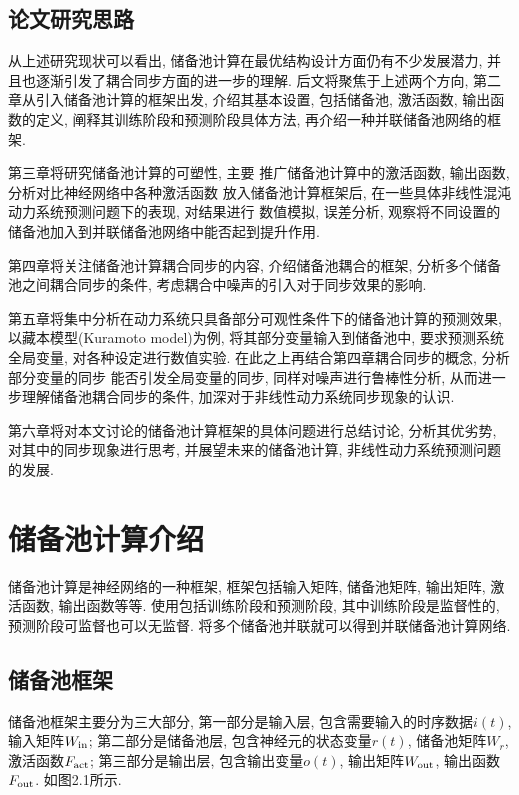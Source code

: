 \documentclass[notitlepage,cs4size,punct,oneside]{ctexrep}
\numberwithin{equation}{chapter}
\theoremstyle{mystyle}
\begin{document}
\section{论文研究思路}

从上述研究现状可以看出, 储备池计算在最优结构设计方面仍有不少发展潜力, 
并且也逐渐引发了耦合同步方面的进一步的理解. 
后文将聚焦于上述两个方向, 第二章从引入储备池计算的框架出发, 
介绍其基本设置, 包括储备池, 激活函数, 输出函数的定义, 
阐释其训练阶段和预测阶段具体方法, 再介绍一种并联储备池网络的框架. 

第三章将研究储备池计算的可塑性, 主要
推广储备池计算中的激活函数, 输出函数, 分析对比神经网络中各种激活函数
放入储备池计算框架后, 在一些具体非线性混沌动力系统预测问题下的表现, 对结果进行
数值模拟, 误差分析, 观察将不同设置的储备池加入到并联储备池网络中能否起到提升作用. 

第四章将关注储备池计算耦合同步的内容, 介绍储备池耦合的框架, 
分析多个储备池之间耦合同步的条件, 考虑耦合中噪声的引入对于同步效果的影响. 

第五章将集中分析在动力系统只具备部分可观性条件下的储备池计算的预测效果, 
以藏本模型(Kuramoto model)为例, 将其部分变量输入到储备池中, 要求预测系统全局变量, 
对各种设定进行数值实验. 在此之上再结合第四章耦合同步的概念, 分析部分变量的同步
能否引发全局变量的同步, 同样对噪声进行鲁棒性分析, 从而进一步理解储备池耦合同步的条件, 
加深对于非线性动力系统同步现象的认识.  

第六章将对本文讨论的储备池计算框架的具体问题进行总结讨论, 分析其优劣势, 
对其中的同步现象进行思考, 并展望未来的储备池计算, 非线性动力系统预测问题的发展. 


\chapter{储备池计算介绍}
储备池计算是神经网络的一种框架, 
框架包括输入矩阵, 储备池矩阵, 输出矩阵, 激活函数, 输出函数等等. 
使用包括训练阶段和预测阶段, 其中训练阶段是监督性的, 预测阶段可监督也可以无监督. 
将多个储备池并联就可以得到并联储备池计算网络. 

\section{储备池框架}
储备池框架主要分为三大部分, 第一部分是输入层, 包含需要输入的时序数据$i(t)$, 
输入矩阵$W_{\textmd{in}}$; 第二部分是储备池层, 包含神经元的状态变量$r(t)$, 
储备池矩阵$W_{r}$, 
激活函数$F_{\textmd{act}}$; 第三部分是输出层, 包含输出变量$o(t)$, 
输出矩阵$W_{\textmd{out}}$, 
输出函数$F_{\textmd{out}}$. 如图2.1所示. 
\end{document}
